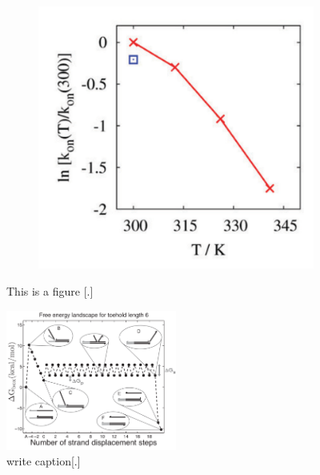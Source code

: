 \begin{figure}[ht]
\begin{centering}
\begin{subfigure}[t]{\dimexpr.2\linewidth-1.3em\relax}
  \includegraphics[width=1.5\linewidth,valign=t]{Figures/hybridDiag6.png}
  \end{subfigure}
  \caption{This is a figure [.]}
  \label{fig:test}
  \end{centering}

\end{figure}


\begin{figure}[ht]
\begin{center}
  \includegraphics[width=0.5\textwidth]{Figures/ToeholdDiagram.png}
  \caption{write caption[.]}
\end{center}
\end{figure}


